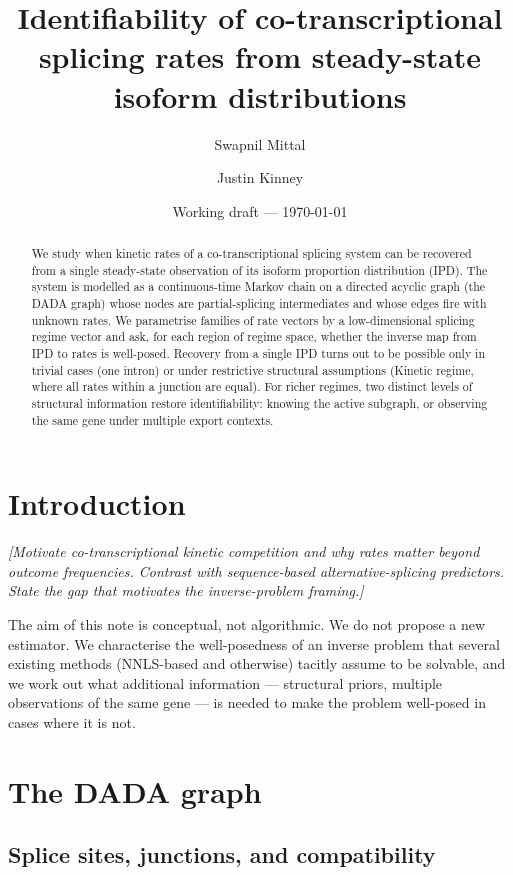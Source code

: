\documentclass[11pt, a4paper]{article}
\title{Identifiability of co-transcriptional splicing rates from steady-state isoform distributions}
\author{Swapnil Mittal \and Justin Kinney}
\date{Working draft --- \today}
\newcommand{\note}[1]{\textcolor{red!70!black}{\textit{[#1]}}}
\begin{document}
\maketitle

\begin{abstract}
We study when kinetic rates of a co-transcriptional splicing system can be recovered from a single steady-state observation of its isoform proportion distribution (IPD). The system is modelled as a continuous-time Markov chain on a directed acyclic graph (the DADA graph) whose nodes are partial-splicing intermediates and whose edges fire with unknown rates. We parametrise families of rate vectors by a low-dimensional splicing regime vector and ask, for each region of regime space, whether the inverse map from IPD to rates is well-posed. Recovery from a single IPD turns out to be possible only in trivial cases (one intron) or under restrictive structural assumptions (Kinetic regime, where all rates within a junction are equal). For richer regimes, two distinct levels of structural information restore identifiability: knowing the active subgraph, or observing the same gene under multiple export contexts.
\end{abstract}

\section{Introduction}

\note{Motivate co-transcriptional kinetic competition and why \emph{rates} matter beyond outcome frequencies. Contrast with sequence-based alternative-splicing predictors. State the gap that motivates the inverse-problem framing.}

The aim of this note is conceptual, not algorithmic. We do not propose a new estimator. We characterise the well-posedness of an inverse problem that several existing methods (NNLS-based and otherwise) tacitly assume to be solvable, and we work out what additional information --- structural priors, multiple observations of the same gene --- is needed to make the problem well-posed in cases where it is not.

\section{The DADA graph}

\subsection{Splice sites, junctions, and compatibility}
\end{document}
